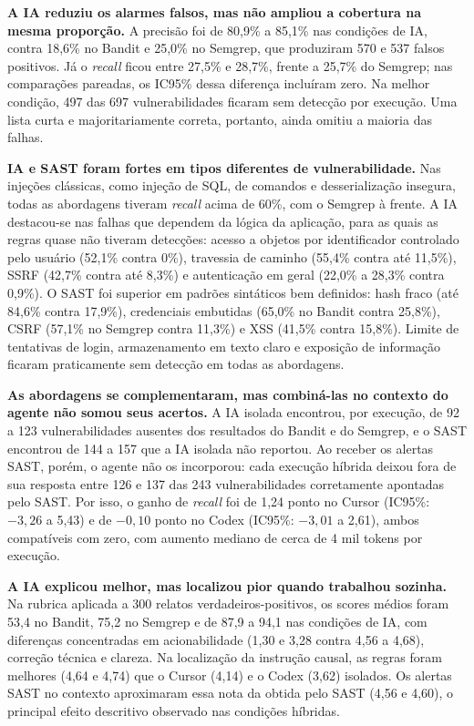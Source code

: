 \textbf{A IA reduziu os alarmes falsos, mas não ampliou a cobertura na mesma
proporção.} A precisão foi de 80,9\% a 85,1\% nas condições de IA, contra 18,6\%
no Bandit e 25,0\% no Semgrep, que produziram 570 e 537 falsos positivos. Já o
\textit{recall} ficou entre 27,5\% e 28,7\%, frente a 25,7\% do Semgrep; nas
comparações pareadas, os IC95\% dessa diferença incluíram zero. Na melhor
condição, 497 das 697 vulnerabilidades ficaram sem detecção por execução. Uma
lista curta e majoritariamente correta, portanto, ainda omitiu a maioria das
falhas.

\textbf{IA e SAST foram fortes em tipos diferentes de vulnerabilidade.}
Nas injeções clássicas, como injeção de SQL, de comandos e desserialização
insegura, todas as abordagens tiveram \textit{recall} acima de 60\%, com o
Semgrep à frente. A IA destacou-se nas falhas que dependem da lógica da
aplicação, para as quais as regras quase não tiveram detecções: acesso a objetos
por identificador controlado pelo usuário (52,1\% contra 0\%), travessia de
caminho (55,4\% contra até 11,5\%), SSRF (42,7\% contra até 8,3\%) e
autenticação em geral (22,0\% a 28,3\% contra 0,9\%). O SAST foi superior em
padrões sintáticos bem definidos: hash fraco (até 84,6\% contra 17,9\%),
credenciais embutidas (65,0\% no Bandit contra 25,8\%), CSRF (57,1\% no Semgrep
contra 11,3\%) e XSS (41,5\% contra 15,8\%). Limite de tentativas de login,
armazenamento em texto claro e exposição de informação ficaram praticamente sem
detecção em todas as abordagens.

\textbf{As abordagens se complementaram, mas combiná-las no contexto do agente
não somou seus acertos.} A IA isolada encontrou, por execução, de 92 a 123
vulnerabilidades ausentes dos resultados do Bandit e do Semgrep, e o SAST
encontrou de 144 a 157 que a IA isolada não reportou. Ao receber os alertas
SAST, porém, o agente não os incorporou: cada execução híbrida deixou fora de
sua resposta entre 126 e 137 das 243 vulnerabilidades corretamente apontadas
pelo SAST. Por isso, o ganho de \textit{recall} foi de 1,24 ponto no Cursor
(IC95\%: $-3,26$ a 5,43) e de $-0,10$ ponto no Codex (IC95\%: $-3,01$ a 2,61),
ambos compatíveis com zero, com aumento mediano de cerca de 4 mil tokens por
execução.

\textbf{A IA explicou melhor, mas localizou pior quando trabalhou sozinha.}
Na rubrica aplicada a 300 relatos verdadeiros-positivos, os scores médios foram
53,4 no Bandit, 75,2 no Semgrep e de 87,9 a 94,1 nas condições de IA, com
diferenças concentradas em acionabilidade (1,30 e 3,28 contra 4,56 a 4,68),
correção técnica e clareza. Na localização da instrução causal, as regras foram
melhores (4,64 e 4,74) que o Cursor (4,14) e o Codex (3,62) isolados. Os alertas
SAST no contexto aproximaram essa nota da obtida pelo SAST (4,56 e 4,60), o
principal efeito descritivo observado nas condições híbridas.

